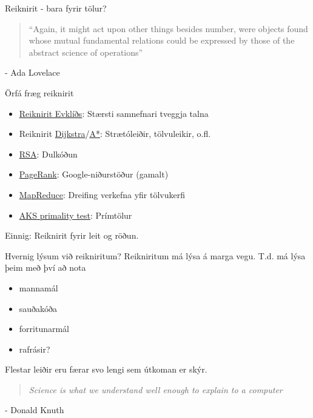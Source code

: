 \documentclass{beamer}
\begin{document}
\begin{frame}{Reiknirit - bara fyrir tölur?}
\begin{quote}
``Again, it might act upon other things besides number, were objects found whose mutual fundamental relations could be expressed by those of the abstract science of operations''
\end{quote} - Ada Lovelace
\end{frame}

\begin{frame}{Örfá fræg reiknirit}

\begin{itemize}
 \item \href{http://en.wikipedia.org/wiki/Euclidean_algorithm}{Reiknirit Evklíðs}: Stærsti samnefnari tveggja talna
 \item Reiknirit \href{http://en.wikipedia.org/wiki/Dijkstra\%27s\_algorithm}{Dijkstra}/\href{http://en.wikipedia.org/wiki/A*\_search_algorithm}{A*}: Strætóleiðir, tölvuleikir, o.fl.
 \item \href{http://en.wikipedia.org/wiki/RSA\_(algorithm)}{RSA}: Dulkóðun
 \item \href{http://en.wikipedia.org/wiki/PageRank}{PageRank}: Google-niðurstöður (gamalt)
 \item \href{http://en.wikipedia.org/wiki/MapReduce}{MapReduce}: Dreifing verkefna yfir tölvukerfi
 \item \href{http://en.wikipedia.org/wiki/AKS\_primality\_test}{AKS primality test}: Prímtölur
\end{itemize}
Einnig: Reiknirit fyrir leit og röðun.
\end{frame}


\begin{frame}{Hvernig lýsum við reikniritum?}
Reikniritum má lýsa á marga vegu. T.d. má lýsa þeim með því að nota
\begin{itemize}
 \item mannamál
 \item sauðakóða
 \item forritunarmál
 \item rafrásir?
\end{itemize}
Flestar leiðir eru færar svo lengi sem útkoman er skýr.
\pause

\vspace{0.5cm}
\begin{quote}
\emph{Science is what we understand well enough to explain to a computer}
\end{quote} - Donald Knuth
\end{frame}
\end{document}
